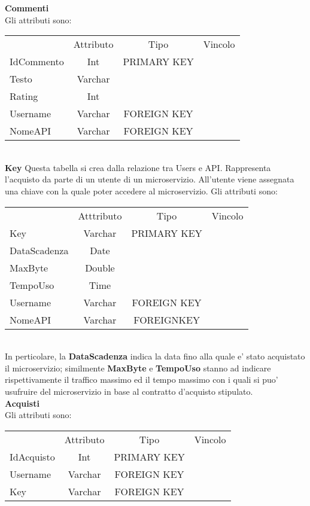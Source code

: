 {{		\textbf{Commenti}\\
			Gli attributi sono:
			\begin{center}
			\begin{tabular}{lccc}
				&Attributo&Tipo&Vincolo\\
				IdCommento&Int&PRIMARY KEY\\
				Testo&Varchar& \\
				Rating&Int& \\
				Username&Varchar&FOREIGN KEY\\
				NomeAPI&Varchar&FOREIGN KEY\\
			\end{tabular}
			\end{center}\\
		
		\textbf{Key}
			Questa tabella si crea dalla relazione tra Users e API. Rappresenta l'acquisto da parte di un utente di un microservizio. All'utente viene assegnata una chiave con la quale poter accedere al microservizio. Gli attributi sono:
			\begin{center}
			\begin{tabular}{lccc}
				&Atttributo&Tipo&Vincolo\\
				Key&Varchar&PRIMARY KEY\\
				DataScadenza&Date& \\
				MaxByte&Double& \\
				TempoUso&Time& \\
				Username&Varchar&FOREIGN KEY\\
				NomeAPI&Varchar&FOREIGNKEY\\			
			\end{tabular}
			\end{center}\\
			In perticolare, la \textbf{DataScadenza} indica la data fino alla quale e' stato acquistato il microservizio; similmente \textbf{MaxByte} e \textbf{TempoUso} stanno ad indicare rispettivamente il traffico massimo ed il tempo massimo con i quali si puo' usufruire del microservizio in base al contratto d'acquisto stipulato.\\
			
		\textbf{Acquisti}\\
		Gli attributi sono: \\
		\begin{center}
		\begin{tabular}{lccc}
			&Attributo&Tipo&Vincolo\\
			IdAcquisto&Int&PRIMARY KEY\\
			Username&Varchar&FOREIGN KEY\\
			Key&Varchar&FOREIGN KEY\\
		\end{tabular}
		\end{center}\\
			
}}
